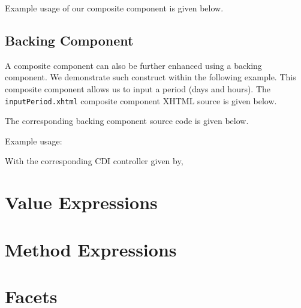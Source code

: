 Example usage of our composite component is given below.


\subsection{Backing Component}
A composite component can also be further enhanced using a backing component.
We demonstrate such construct within the following example.
This composite component allows us to input a period (days and hours).
The \texttt{inputPeriod.xhtml} composite component XHTML source is given below.

The corresponding backing component source code is given below.

Example usage:

With the corresponding CDI controller given by,


\section{Value Expressions}

\section{Method Expressions}

\section{Facets}